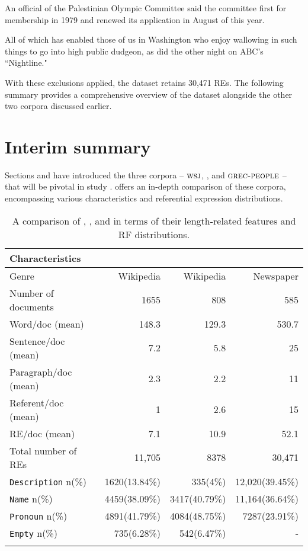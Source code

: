 \begin{exe}
	\ex\label{ex:verbal} An official of the Palestinian Olympic Committee said the committee first  for membership in 1979 and renewed its application in August of this year.
\end{exe} 

\begin{exe}
	\ex\label{ex:coordinated} All of which has enabled those of us in Washington who enjoy wallowing
	in such things to go into high public dudgeon, as  did the other night on ABC’s ``Nightline."
\end{exe} 

With these exclusions applied, the dataset retains 30,471 REs. The following summary provides a comprehensive overview of the \wsj dataset alongside the other two corpora discussed earlier. 
 
\section{Interim summary}

Sections  and  have introduced the three corpora -- $\textsc{wsj}$, \msrcor, and $\textsc{grec-people}$ -- that will be pivotal in study \studA.  offers an in-depth comparison of these corpora, encompassing various characteristics and referential expression distributions.

\begin{table}
	\begin{tabularx}{\textwidth}{Xrrr}
		\lsptoprule
		Characteristics & \msrcor & \negcor & \wsj \\
		\midrule
		Genre & Wikipedia & Wikipedia & Newspaper\\
		Number of documents& 1655 & 808 & 585 \\ 
		Word/doc (mean) & 148.3 & 129.3 & 530.7 \\ 
		Sentence/doc (mean)& 7.2 & 5.8 & 25 \\ 
		Paragraph/doc (mean)& 2.3 & 2.2 & 11 \\ 
		Referent/doc (mean) & 1 & 2.6 & 15 \\ 
		RE/doc (mean) & 7.1 & 10.9 & 52.1 \\ 
		Total number of REs & 11,705 & 8378 & 30,471 \\ 
		\texttt{Description} n(\%) & 1620(13.84\%) & 335(4\%) & 12,020(39.45\%) \\ 
		\texttt{Name} n(\%) & 4459(38.09\%) & 3417(40.79\%) & 11,164(36.64\%) \\ 
		\texttt{Pronoun} n(\%) & 4891(41.79\%) & 4084(48.75\%) & 7287(23.91\%) \\ 
		\texttt{Empty} n(\%) & 735(6.28\%) & 542(6.47\%) & - \\
		\lspbottomrule
	\end{tabularx}
	\caption[A detailed overview of \msrcor, \negcor, and \wsj corpora.]{\label{tab:corporachap4} A comparison of \msrcor, \negcor, and \wsj in terms of their length-related features and RF distributions.
	}
\end{table}

